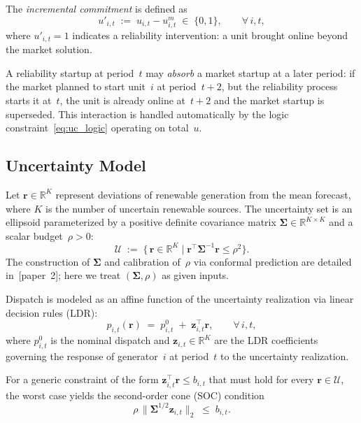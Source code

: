 \documentclass[journal]{IEEEtran}
\begin{document}
The \emph{incremental commitment} is defined as
\begin{equation}\label{eq:uprime}
    u'_{i,t} \;:=\; u_{i,t} - u_{i,t}^m \;\in\; \{0,1\},
    \qquad \forall\, i,t,
\end{equation}
where $u'_{i,t} = 1$ indicates a reliability intervention: a unit
brought online beyond the market solution.

A reliability startup at period~$t$ may \emph{absorb} a market
startup at a later period: if the market planned to start unit~$i$ at
period~$t{+}2$, but the reliability process starts it at~$t$, the
unit is already online at~$t{+}2$ and the market startup is
superseded.
This interaction is handled automatically by the logic
constraint~\eqref{eq:uc_logic} operating on total~$u$.

\subsection{Uncertainty Model}\label{sec:uncertainty}

Let $\mathbf{r} \in \mathbb{R}^K$ represent deviations of renewable
generation from the mean forecast, where $K$ is the number of
uncertain renewable sources.
The uncertainty set is an ellipsoid parameterized by a positive
definite covariance matrix
$\boldsymbol{\Sigma} \in \mathbb{R}^{K \times K}$ and a scalar
budget~$\rho > 0$:
\begin{equation}\label{eq:uset}
    \mathcal{U} \;:=\;
    \bigl\{\, \mathbf{r} \in \mathbb{R}^K \;\big|\;
    \mathbf{r}^\top \boldsymbol{\Sigma}^{-1} \mathbf{r}
    \leq \rho^2 \bigr\}.
\end{equation}
The construction of $\boldsymbol{\Sigma}$ and calibration of~$\rho$
via conformal prediction are detailed in~[paper~2]; here we treat
$(\boldsymbol{\Sigma}, \rho)$ as given inputs.

Dispatch is modeled as an affine function of the uncertainty
realization via linear decision rules (LDR):
\begin{equation}\label{eq:ldr}
    p_{i,t}(\mathbf{r})
    \;=\; p_{i,t}^0
    \;+\; \mathbf{z}_{i,t}^\top \mathbf{r},
    \qquad \forall\, i,t,
\end{equation}
where $p_{i,t}^0$ is the nominal dispatch and
$\mathbf{z}_{i,t} \in \mathbb{R}^K$ are the LDR coefficients
governing the response of generator~$i$ at period~$t$ to the
uncertainty realization.

For a generic constraint of the form
$\mathbf{z}_{i,t}^\top \mathbf{r} \leq b_{i,t}$ that must hold for
every $\mathbf{r} \in \mathcal{U}$, the worst case yields the
second-order cone (SOC) condition
\begin{equation}\label{eq:soc_generic}
    \rho\,
    \bigl\lVert
      \boldsymbol{\Sigma}^{1/2} \mathbf{z}_{i,t}
    \bigr\rVert_2
    \;\leq\; b_{i,t}.
\end{equation}
\end{document}
